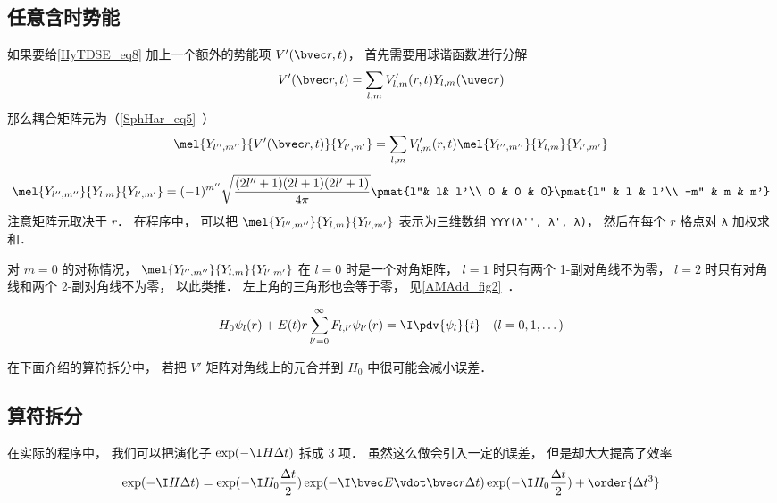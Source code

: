 \subsection{任意含时势能}
如果要给\autoref{HyTDSE_eq8} 加上一个额外的势能项 $V'(\bvec r, t)$， 首先需要用球谐函数进行分解
\begin{equation}\label{HyTDSE_eq6}
V'(\bvec r, t) = \sum_{l,m} V'_{l,m}(r, t) Y_{l,m}(\uvec r)
\end{equation}
那么耦合矩阵元为（\autoref{SphHar_eq5}~）
\begin{equation}\label{HyTDSE_eq5}
\mel{Y_{l'',m''}}{V'(\bvec r, t)}{Y_{l',m'}} = \sum_{l,m} V'_{l,m}(r, t) \mel{Y_{l'',m''}}{Y_{l,m}}{Y_{l',m'}}
\end{equation}
\begin{equation}
\mel{Y_{l'',m''}}{Y_{l,m}}{Y_{l',m'}} = (-1)^{m''}\sqrt{\frac{(2l''+1)(2l+1)(2l'+1)}{4\pi}} \pmat{l''& l& l'\\ 0 & 0 & 0}\pmat{l'' & l & l'\\  -m'' & m & m'}
\end{equation}
注意矩阵元取决于 $r$． 在程序中， 可以把 $\mel{Y_{l'',m''}}{Y_{l,m}}{Y_{l',m'}}$ 表示为三维数组 \verb|YYY(λ'', λ', λ)|， 然后在每个 $r$ 格点对 \verb|λ| 加权求和．

对 $m = 0$ 的对称情况， $\mel{Y_{l'',m''}}{Y_{l,m}}{Y_{l',m'}}$ 在 $l = 0$ 时是一个对角矩阵， $l = 1$ 时只有两个 1-副对角线不为零， $l = 2$ 时只有对角线和两个 2-副对角线不为零， 以此类推． 左上角的三角形也会等于零， 见\autoref{AMAdd_fig2}~．

\begin{equation}
H_0 \psi_{l}(r) + E(t)r\sum_{l' = 0}^{\infty} F_{l, l'} \psi_{l'}(r) = \I \pdv{\psi_{l}}{t} \quad (l=0,1,\dots)
\end{equation}

在下面介绍的算符拆分中， 若把 $V'$ 矩阵对角线上的元合并到 $H_0$ 中很可能会减小误差．

\subsection{算符拆分}
在实际的程序中， 我们可以把演化子 $\exp(-\I H \Delta t)$ 拆成 3 项． 虽然这么做会引入一定的误差， 但是却大大提高了效率
\begin{equation}\label{HyTDSE_eq2}
\exp(-\I H \Delta t) = \exp(-\I H_0 \frac{\Delta t}{2}) \exp(-\I \bvec E \vdot \bvec r \Delta t)\exp(-\I H_0 \frac{\Delta t}{2}) + \order{\Delta t^3}
\end{equation}

